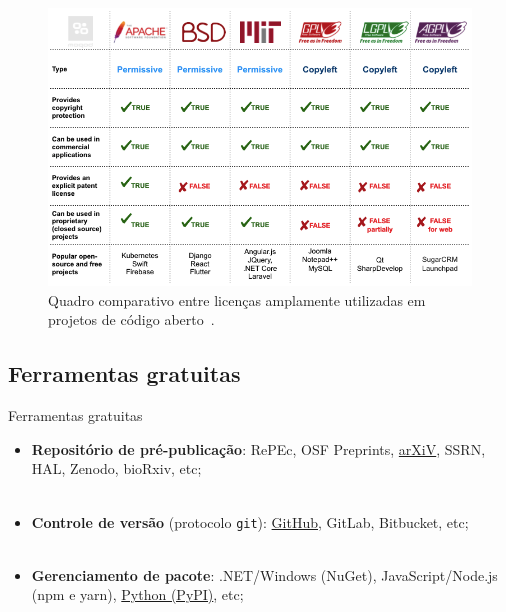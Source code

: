 \begin{frame}{}
	\begin{figure}
		\centering
		\includegraphics[scale=0.325]{figs/open_source_license.png}
		\caption{Quadro comparativo entre licenças amplamente utilizadas em projetos de código aberto~\cite{Todavchich:21}.}
		\label{f.open_source_license}
	\end{figure}
\end{frame}

\subsection{Ferramentas gratuitas}
\label{ss.free_tools}


\begin{frame}{Ferramentas gratuitas}
	\justify 
	\begin{itemize}
		\item<1> \textbf{Repositório de pré-publicação}: RePEc, OSF Preprints, \underline{arXiV}, SSRN, HAL, Zenodo, bioRxiv, etc;
		\\~\\
		\item<2> \textbf{Controle de versão} (protocolo \texttt{git}): \underline{GitHub}, GitLab, Bitbucket, etc;
		\\~\\
		\item<3> \textbf{Gerenciamento de pacote}: .NET/Windows (NuGet), JavaScript/Node.js (npm e yarn), \underline{Python (PyPI)}, etc;
	\end{itemize}
\end{frame}